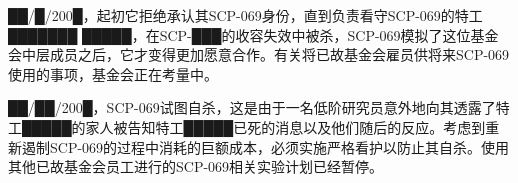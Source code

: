 ██\slash █\slash 200█，起初它拒绝承认其SCP-069身份，直到负责看守SCP-069的特工███████ █████，在SCP-███的收容失效中被杀，SCP-069模拟了这位基金会中层成员之后，它才变得更加愿意合作。有关将已故基金会雇员供将来SCP-069使用的事项，基金会正在考量中。

██\slash ██\slash 200█，SCP-069试图自杀，这是由于一名低阶研究员意外地向其透露了特工█████的家人被告知特工█████已死的消息以及他们随后的反应。考虑到重新遏制SCP-069的过程中消耗的巨额成本，必须实施严格看护以防止其自杀。使用其他已故基金会员工进行的SCP-069相关实验计划已经暂停。

